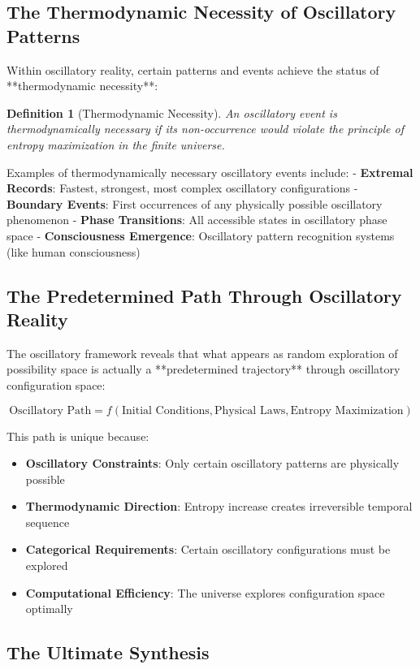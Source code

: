 \documentclass[11pt]{article}
\newtheorem{definition}[theorem]{Definition}
\theoremstyle{remark}
\begin{document}
\subsection{The Thermodynamic Necessity of Oscillatory Patterns}

Within oscillatory reality, certain patterns and events achieve the status of **thermodynamic necessity**:

\begin{definition}[Thermodynamic Necessity]
An oscillatory event is thermodynamically necessary if its non-occurrence would violate the principle of entropy maximization in the finite universe.
\end{definition}

Examples of thermodynamically necessary oscillatory events include:
- \textbf{Extremal Records}: Fastest, strongest, most complex oscillatory configurations
- \textbf{Boundary Events}: First occurrences of any physically possible oscillatory phenomenon  
- \textbf{Phase Transitions}: All accessible states in oscillatory phase space
- \textbf{Consciousness Emergence}: Oscillatory pattern recognition systems (like human consciousness)

\subsection{The Predetermined Path Through Oscillatory Reality}

The oscillatory framework reveals that what appears as random exploration of possibility space is actually a **predetermined trajectory** through oscillatory configuration space:

$$\text{Oscillatory Path} = f(\text{Initial Conditions}, \text{Physical Laws}, \text{Entropy Maximization})$$

This path is unique because:
\begin{itemize}
\item \textbf{Oscillatory Constraints}: Only certain oscillatory patterns are physically possible
\item \textbf{Thermodynamic Direction}: Entropy increase creates irreversible temporal sequence
\item \textbf{Categorical Requirements}: Certain oscillatory configurations must be explored
\item \textbf{Computational Efficiency}: The universe explores configuration space optimally
\end{itemize}

\subsection{The Ultimate Synthesis}
\end{document}
